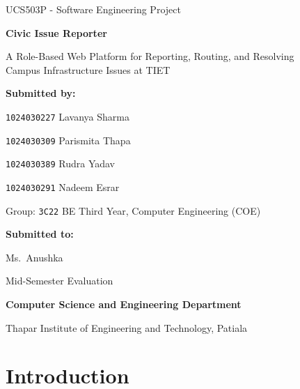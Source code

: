 \documentclass[11pt]{report}
\begin{document}
\raggedbottom

\begin{titlepage}
  \centering
  \large UCS503P - Software Engineering Project\par
  \vspace{2cm}
  {\Huge\bfseries Civic Issue Reporter\par}
  \vspace{0.8cm}
  {\large A Role-Based Web Platform for Reporting, Routing, and Resolving\\
  Campus Infrastructure Issues at TIET\par}
  \vspace{2cm}
  \textbf{Submitted by:}\par
  \vspace{6pt}
  \texttt{1024030227} Lavanya Sharma\par
  \texttt{1024030309} Parismita Thapa\par
  \texttt{1024030389} Rudra Yadav\par
  \texttt{1024030291} Nadeem Esrar\par

  \vspace{1.2cm}
  \large Group: \texttt{3C22} \quad BE Third Year, Computer Engineering (COE)\par
  \vspace{1.2cm}

  \textbf{Submitted to:}\par
  \vspace{6pt}
  Ms.\ Anushka\par

  \vfill
  {\large Mid-Semester Evaluation\par}
  \vspace{0.2cm}
  \textbf{Computer Science and Engineering Department}\par
  \vspace{0.15cm}
  Thapar Institute of Engineering and Technology, Patiala\par
\end{titlepage}

\tableofcontents

\chapter{Introduction}
\end{document}
